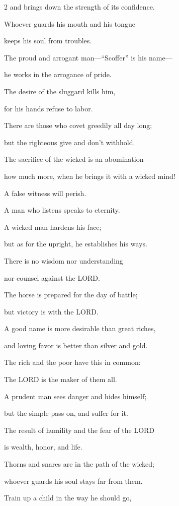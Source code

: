 \begin{multicols}{2}
and brings down the strength of its confidence.


\myverse{}Whoever guards his mouth and his tongue

keeps his soul from troubles.


\myverse{}The proud and arrogant man—“Scoffer” is his name—

he works in the arrogance of pride.


\myverse{}The desire of the sluggard kills him,

for his hands refuse to labor.


\myverse{}There are those who covet greedily all day long;

but the righteous give and don’t withhold.


\myverse{}The sacrifice of the wicked is an abomination—

how much more, when he brings it with a wicked mind!


\myverse{}A false witness will perish.

A man who listens speaks to eternity.


\myverse{}A wicked man hardens his face;

but as for the upright, he establishes his ways.


\myverse{}There is no wisdom nor understanding

nor counsel against the LORD.


\myverse{}The horse is prepared for the day of battle;

but victory is with the LORD.

\mychapter{} \myverse*{}A good name is more desirable than great riches,

and loving favor is better than silver and gold.


\myverse{}The rich and the poor have this in common:

The LORD is the maker of them all.


\myverse{}A prudent man sees danger and hides himself;

but the simple pass on, and suffer for it.


\myverse{}The result of humility and the fear of the LORD

is wealth, honor, and life.


\myverse{}Thorns and snares are in the path of the wicked;

whoever guards his soul stays far from them.


\myverse{}Train up a child in the way he should go,


\end{multicols}
